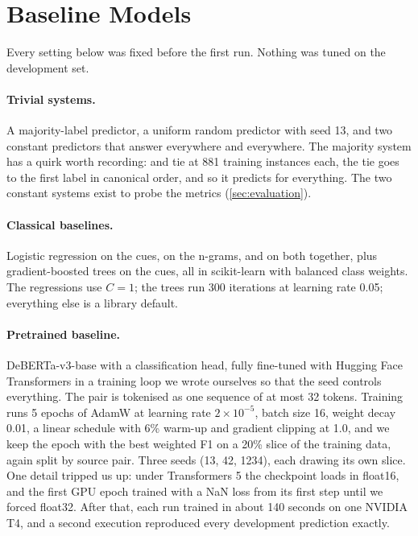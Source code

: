 \section{Baseline Models}
\label{sec:baselines}

Every setting below was fixed before the first run. Nothing was tuned on the development set.

\paragraph{Trivial systems.}
A majority-label predictor, a uniform random predictor with seed 13, and two constant predictors that answer \EQ{} everywhere and \NO{} everywhere. The majority system has a quirk worth recording: \FW{} and \BW{} tie at 881 training instances each, the tie goes to the first label in canonical order, and so it predicts \FW{} for everything. The two constant systems exist to probe the metrics (\cref{sec:evaluation}).

\paragraph{Classical baselines.}
Logistic regression on the cues, on the n-grams, and on both together, plus gradient-boosted trees on the cues, all in scikit-learn \citep{pedregosa-etal-2011-scikit} with balanced class weights. The regressions use $C = 1$; the trees run 300 iterations at learning rate 0.05; everything else is a library default.

\paragraph{Pretrained baseline.}
DeBERTa-v3-base \citep{he-etal-2023-debertav3} with a classification head, fully fine-tuned with Hugging Face Transformers \citep{wolf-etal-2020-transformers} in a training loop we wrote ourselves so that the seed controls everything. The pair is tokenised as one sequence of at most 32 tokens. Training runs 5 epochs of AdamW at learning rate $2 \times 10^{-5}$, batch size 16, weight decay 0.01, a linear schedule with 6\% warm-up and gradient clipping at 1.0, and we keep the epoch with the best weighted F1 on a 20\% slice of the training data, again split by source pair. Three seeds (13, 42, 1234), each drawing its own slice. One detail tripped us up: under Transformers 5 the checkpoint loads in float16, and the first GPU epoch trained with a NaN loss from its first step until we forced float32. After that, each run trained in about 140 seconds on one NVIDIA T4, and a second execution reproduced every development prediction exactly.
